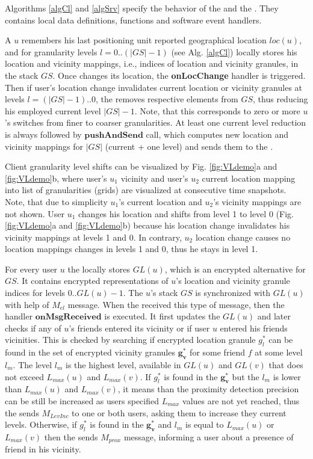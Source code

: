 Algorithms \ref{algCl} and \ref{algSrv} specify the behavior of the \md and the
\ls. They contains local data definitions, functions and software
event handlers. 

A \md $u$ remembers his last positioning unit reported geographical location
$loc(u)$, and for granularity levels $l=0..(|GS|-1)$ (see Alg. \ref{algCl}) locally stores his
location and vicinity mappings, i.e., indices of location and vicinity granules,
in the stack $GS$. Once \md changes its location, the \textbf{onLocChange}
handler is triggered. Then if user's location change invalidates current
location or vicinity granules at levels $l=(|GS|-1) .. 0$, the \md removes
respective elements from $GS$, thus reducing his employed current level
$|GS|-1$. Note, that this corresponds to zero or more $u$'s switches from finer
to coarser granularities. At least one current level reduction is always followed by
$\textbf{pushAndSend}$ call, which computes new location and vicinity mappings
for $|GS|$ (current + one level) and sends them to the \ls.
 
Client granularity level shifts can be visualized by Fig. \ref{fig:VLdemo}a and
\ref{fig:VLdemo}b, where user's $u_1$ vicinity and user's $u_2$ current location
mapping into list of granularities (grids) are visualized at consecutive time
snapshots. Note, that due to simplicity $u_1$'s current location and $u_2$'s
vicinity mappings are not shown. User $u_1$ changes his location and shifts
from level 1 to level 0 (Fig. \ref{fig:VLdemo}a and \ref{fig:VLdemo}b) because
his location change invalidates his vicinity mappings at levels 1 and 0.
In contrary, $u_2$ location change causes no location mappings changes in levels
1 and 0, thus he stays in level 1.

For every user $u$ the \ls locally stores $GL(u)$, which is an encrypted
alternative for $GS$. It contains encrypted representations of $u$'s location
and vicinity granule indices for levels $0 .. GL(u) - 1$. The $u$'s stack $GS$
is synchronized with $GL(u)$ with help of $M_{el}$ message. When the \ls
received this type of message, then the handler $\mathbf{onMsgReceived}$  is
executed. It first updates the $GL(u)$ and later checks if any of $u$'s friends
entered its vicinity or if user $u$ entered his friends vicinities. This is
checked by searching if encrypted location granule $g^*_l$ can be found in the
set of encrypted vicinity granules $\mathbf{g^*_v}$ for some friend $f$ at some
level $l_m$. The level $l_m$ is the highest level, available in $GL(u)$
and $GL(v)$ that does not exceed $L_{max}(u)$ and $L_{max}(v)$. If $g^*_l$ is
found in the $\mathbf{g^*_v}$ but the $l_m$ is lower than $L_{max}(u)$ and
$L_{max}(v)$, it means than the proximity detection precision can be still
be increased as users specified $L_{max}$ values are not yet reached, thus the
\ls sends $M_{LevInc}$ to one or both users, asking them to increase they
current levels. Otherwise, if $g^*_l$ is found in the $\mathbf{g^*_v}$ and $l_m$
is equal to $L_{max}(u)$ or $L_{max}(v)$ then the \ls sends $M_{prox}$ message,
informing a user about a presence of friend in his vicinity.


